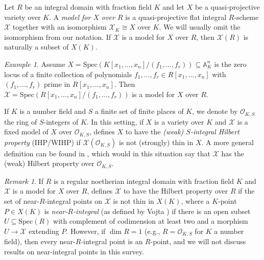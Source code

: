 \documentclass[10pt,a4paper]{amsart}
\theoremstyle{plain}
\theoremstyle{remark}
\newtheorem{remark}[theorem]{Remark}
\newtheorem{example}[theorem]{Example}
\numberwithin{theorem}{section}
\begin{document}
Let $R$ be an integral domain with fraction field $K$ and let $X$ be a quasi-projective variety over $K$. A \emph{model for $X$ over $R$} is a quasi-projective flat integral $R$-scheme $\mathcal{X}$ together with an isomorphism $\mathcal{X}_K\cong X$ over $K$.  
We will usually omit the isomorphism from our notation. 
If $\mathcal{X}$ is a model for $X$ over $R$, then $\mathcal{X}(R)$ is naturally a subset of $X(K)$.

\begin{example} 
Assume $X=\mathrm{Spec}( K[x_1,\ldots,x_n]/(f_1,\ldots,f_r))\subseteq \mathbb{A}^n_K$ is the zero locus of a finite collection of polynomials   $f_1,\ldots, f_r\in R[x_1,\dots,x_n]$ with $(f_1,\ldots,f_r)$ prime in $R[x_1,\ldots,x_n]$.  
Then  $\mathcal{X} = \mathrm{Spec}(R[x_1,\ldots,x_n]/( f_1,\ldots,  f_r))$ is a model for $X$ over $R$. 
\end{example}

If $K$ is a number field and $S$ a finite set of finite places of $K$,
we denote by $\mathcal{O}_{K,S}$ the ring of $S$-integers of $K$.
In this setting,
if $X$ is a variety over $K$
and $\mathcal{X}$ is  a  fixed model of $X$ over $\mathcal{O}_{K,S}$,
\cite{Coccia}
defines $X$  to have the {\em (weak) $S$-integral Hilbert property }
(IHP/WIHP) if $\mathcal{X}(\mathcal{O}_{K,S})$ is not (strongly) thin in $X$.
A more general definition can be found in \cite{Luger},
which would in this situation say that $\mathcal{X}$ has the (weak) Hilbert property over $\mathcal{O}_{K,S}$.  

\begin{remark} 
If $R$ is a regular noetherian integral domain with fraction field $K$ and $\mathcal{X}$ is a model for $X$ over $R$,
\cite{Luger} defines $\mathcal{X}$ to have the Hilbert property over $R$
if the set of near-$R$-integral points on $\mathcal{X}$ is not thin in $X(K)$,
where a $K$-point $P\in X(K)$ is {\em near-$R$-integral} (as defined by Vojta \cite[\S4]{Vojta}) if there is an open subset $U\subseteq \mathrm{Spec}(R)$ with complement of codimension at least two and a morphism $U\to \mathcal{X}$ extending $P$. 
However, if $\dim R = 1$ (e.g., $R= \mathcal{O}_{K,S}$ for $K$ a number field), then every near-$R$-integral point is an $R$-point,
and we will not discuss results on near-integral points in this survey. 
\end{remark}
\end{document}
